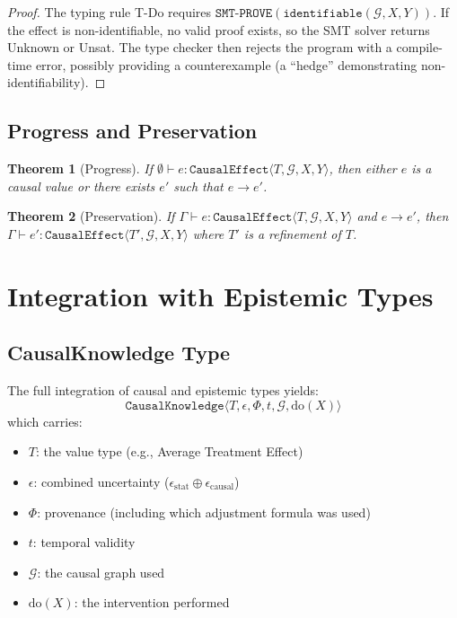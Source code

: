 \documentclass[11pt]{article}
\newtheorem{theorem}{Theorem}
\begin{document}
\begin{proof}
The typing rule T-Do requires $\texttt{SMT-PROVE}(\texttt{identifiable}(\mathcal{G}, X, Y))$. If the effect is non-identifiable, no valid proof exists, so the SMT solver returns Unknown or Unsat. The type checker then rejects the program with a compile-time error, possibly providing a counterexample (a ``hedge'' demonstrating non-identifiability).
\end{proof}

\subsection{Progress and Preservation}

\begin{theorem}[Progress]
If $\emptyset \vdash e : \texttt{CausalEffect}\langle T, \mathcal{G}, X, Y \rangle$, then either $e$ is a causal value or there exists $e'$ such that $e \longrightarrow e'$.
\end{theorem}

\begin{theorem}[Preservation]
If $\Gamma \vdash e : \texttt{CausalEffect}\langle T, \mathcal{G}, X, Y \rangle$ and $e \longrightarrow e'$, then $\Gamma \vdash e' : \texttt{CausalEffect}\langle T', \mathcal{G}, X, Y \rangle$ where $T'$ is a refinement of $T$.
\end{theorem}

\section{Integration with Epistemic Types}

\subsection{CausalKnowledge Type}
The full integration of causal and epistemic types yields:
\[
\texttt{CausalKnowledge}\langle T, \epsilon, \Phi, t, \mathcal{G}, \text{do}(X) \rangle
\]
which carries:
\begin{itemize}
\item $T$: the value type (e.g., Average Treatment Effect)
\item $\epsilon$: combined uncertainty ($\epsilon_{\text{stat}} \oplus \epsilon_{\text{causal}}$)
\item $\Phi$: provenance (including which adjustment formula was used)
\item $t$: temporal validity
\item $\mathcal{G}$: the causal graph used
\item $\text{do}(X)$: the intervention performed
\end{itemize}
\end{document}
